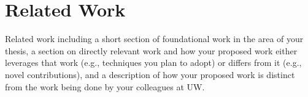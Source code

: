 \section{Related Work}
Related work including a short section of foundational work in the
area of your thesis, a section on directly relevant work and how your
proposed work either leverages that work (e.g., techniques you plan to
adopt) or differs from it (e.g., novel contributions), and a description
of how your proposed work is distinct from the work being done by your
colleagues at UW.